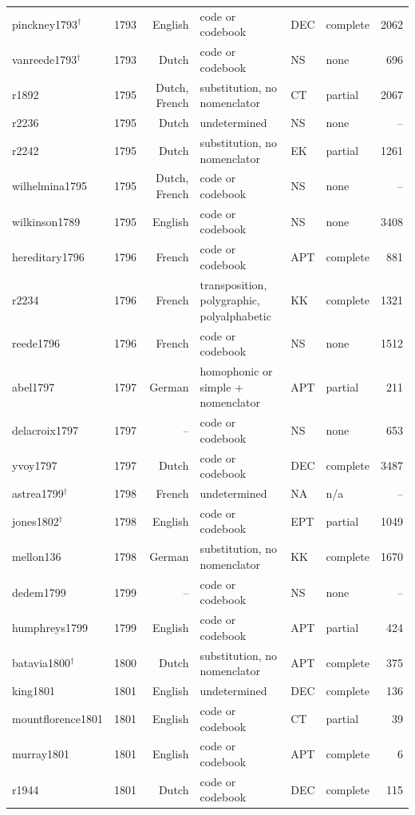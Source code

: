 {\begin{longtable}{@{}llrlllr@{}}
pinckney1793$^\dagger$ & 1793 & English & code or codebook & DEC & complete & 2062 \\
vanreede1793$^\dagger$ & 1793 & Dutch & code or codebook & NS & none & 696 \\
r1892 & 1795 & Dutch, French & substitution, no nomenclator & CT & partial & 2067 \\
r2236 & 1795 & Dutch & undetermined & NS & none & -- \\
r2242 & 1795 & Dutch & substitution, no nomenclator & EK & partial & 1261 \\
wilhelmina1795 & 1795 & Dutch, French & code or codebook & NS & none & -- \\
wilkinson1789 & 1795 & English & code or codebook & NS & none & 3408 \\
hereditary1796 & 1796 & French & code or codebook & APT & complete & 881 \\
r2234 & 1796 & French & transposition, polygraphic, polyalphabetic & KK & complete & 1321 \\
reede1796 & 1796 & French & code or codebook & NS & none & 1512 \\
abel1797 & 1797 & German & homophonic or simple + nomenclator & APT & partial & 211 \\
delacroix1797 & 1797 & -- & code or codebook & NS & none & 653 \\
yvoy1797 & 1797 & Dutch & code or codebook & DEC & complete & 3487 \\
astrea1799$^\dagger$ & 1798 & French & undetermined & NA & n/a & -- \\
jones1802$^\dagger$ & 1798 & English & code or codebook & EPT & partial & 1049 \\
mellon136 & 1798 & German & substitution, no nomenclator & KK & complete & 1670 \\
dedem1799 & 1799 & -- & code or codebook & NS & none & -- \\
humphreys1799 & 1799 & English & code or codebook & APT & partial & 424 \\
batavia1800$^\dagger$ & 1800 & Dutch & substitution, no nomenclator & APT & complete & 375 \\
king1801 & 1801 & English & undetermined & DEC & complete & 136 \\
mountflorence1801 & 1801 & English & code or codebook & CT & partial & 39 \\
murray1801 & 1801 & English & code or codebook & APT & complete & 6 \\
r1944 & 1801 & Dutch & code or codebook & DEC & complete & 115 \\

\end{longtable}}
